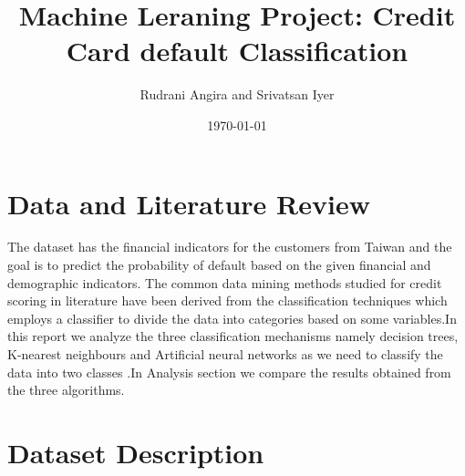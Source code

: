 \documentclass{article}
\title{Machine Leraning Project: Credit Card default Classification}
\author{Rudrani Angira and Srivatsan Iyer}
\date{\today}
\begin{document}
 
\maketitle
 
\section{Data and Literature Review}
 


 The dataset has the financial indicators for the customers from Taiwan and the goal is to predict the probability of default based on the given financial and demographic indicators. The common data mining methods studied for credit scoring in literature  have been derived from the classification techniques which employs a classifier to divide the data into categories based on some variables.In this report we analyze the three classification mechanisms namely decision trees, K-nearest neighbours and Artificial neural networks as we need to classify the data into two classes .In Analysis section we compare the results obtained from the three algorithms. 

\section{Dataset Description}
\end{document}
